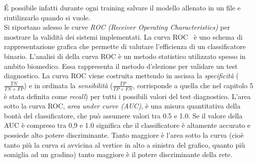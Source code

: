  É possibile infatti durante ogni training salvare il modello allenato in un file e riutilizzarlo quando si vuole.\\
 Si riportano adesso le curve \emph{ROC (Receiver Operating Characteristics)} per mostrare 
 la validità dei sistemi implementati.  
 La curva ROC~\cite{Roc} è uno schema di rappresentazione grafica che permette di valutare l’efficienza 
 di un classificatore binario. L’analisi di della curva ROC è un metodo statistico utilizzato spesso in ambito biomedico. Essa rappresenta il metodo d’elezione 
per validare un test diagnostico. 
La curva ROC viene costruita mettendo in ascissa la \emph{specificità} ($\frac{TN}{TN+FP}$) e in ordinata la \emph{sensibilità} ($\frac{TP}{TP+FN}$, corrisponde a quella che nel capitolo 5 è stata definita come \emph{recall}) per tutti i possibili valori del test diagnostico. L’area sotto la curva ROC, \emph{area
under curve (AUC)}, è una misura quantitativa della bontà del classificatore, che può assumere valori tra 0.5 e
 1.0. Se il valore della AUC è compreso tra 0,9 e 1.0 significa che il classificatore è altamente accurato e possiede alto potere discriminante.
 Tanto maggiore è l’area sotto la curva (cioè tanto
più la curva si avvicina al vertice in alto a sinistra del grafico, quanto più  somiglia ad un gradino) tanto maggiore è il potere discriminante della rete.\\



